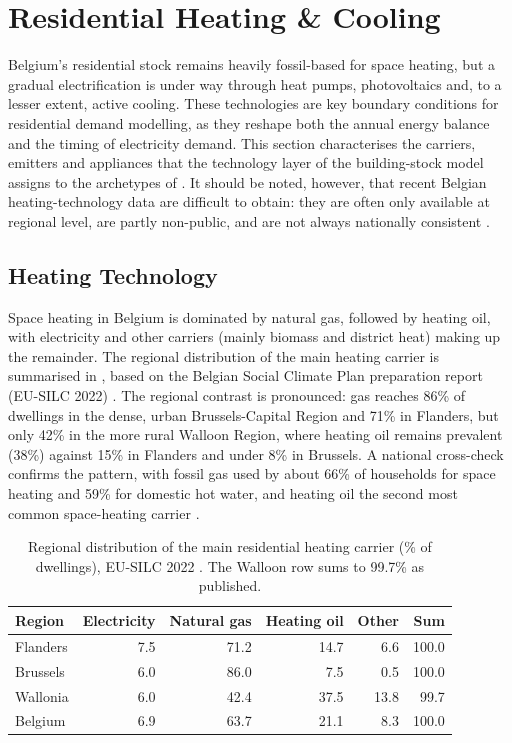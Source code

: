 \section{Residential Heating \& Cooling}\label{sec:heating_cooling}
Belgium's residential stock remains heavily fossil-based for space heating, but a
gradual electrification is under way through heat pumps, photovoltaics and, to a
lesser extent, active cooling. These technologies are key boundary conditions for
residential demand modelling, as they reshape both the annual energy balance and
the timing of electricity demand. This section characterises the carriers,
emitters and appliances that the technology layer of the building-stock model
assigns to the archetypes of . It should be noted, however,
that recent Belgian heating-technology data are difficult to obtain: they are
often only available at regional level, are partly non-public, and are not always
nationally consistent \cite{rap_belgium_2024}.

\subsection{Heating Technology}
Space heating in Belgium is dominated by natural gas, followed by heating oil,
with electricity and other carriers (mainly biomass and district heat) making up
the remainder. The regional distribution of the main heating carrier is
summarised in , based on the Belgian Social
Climate Plan preparation report (EU-SILC 2022) \cite{socialclimateplan_be_2023}.
The regional contrast is pronounced: gas reaches 86\% of dwellings in the dense,
urban Brussels-Capital Region and 71\% in Flanders, but only 42\% in the more
rural Walloon Region, where heating oil remains prevalent (38\%) against 15\% in
Flanders and under 8\% in Brussels. A national cross-check confirms the
pattern, with fossil gas used by about 66\% of households for space heating and
59\% for domestic hot water, and heating oil the second most common space-heating
carrier \cite{rap_belgium_2024}.

\begin{table}[ht]
  \centering
  \caption{Regional distribution of the main residential heating carrier (\% of
           dwellings), EU-SILC 2022 \cite{socialclimateplan_be_2023}. The Walloon
           row sums to 99.7\% as published.}
  \label{tab:heating_carrier_shares}
  \begin{tabular}{lrrrrr}
    \toprule
    Region & Electricity & Natural gas & Heating oil & Other & Sum \\
    \midrule
    Flanders & 7.5  & 71.2 & 14.7 & 6.6  & 100.0 \\
    Brussels & 6.0  & 86.0 & 7.5  & 0.5  & 100.0 \\
    Wallonia & 6.0  & 42.4 & 37.5 & 13.8 & 99.7  \\
    \midrule
    Belgium  & 6.9  & 63.7 & 21.1 & 8.3  & 100.0 \\
    \bottomrule
  \end{tabular}
\end{table}

